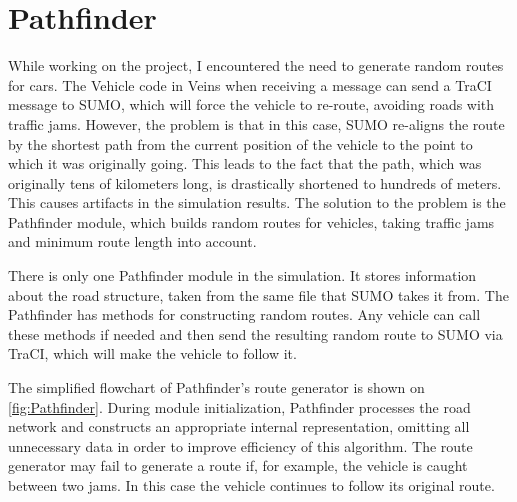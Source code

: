 \documentclass[]{nsm-thesis}
\begin{document}
\section{Pathfinder}

While working on the project, I encountered the need to generate random routes for cars. The Vehicle code in Veins when receiving a message can send a TraCI message to SUMO, which will force the vehicle to re-route, avoiding roads with traffic jams. However, the problem is that in this case, SUMO re-aligns the route by the shortest path from the current position of the vehicle to the point to which it was originally going. This leads to the fact that the path, which was originally tens of kilometers long, is drastically shortened to hundreds of meters. This causes artifacts in the simulation results. The solution to the problem is the Pathfinder module, which builds random routes for vehicles, taking traffic jams and minimum route length into account.

There is only one Pathfinder module in the simulation. It stores information about the road structure, taken from the same file that SUMO takes it from. The Pathfinder has methods for constructing random routes. Any vehicle can call these methods if needed and then send the resulting random route to SUMO via TraCI, which will make the vehicle to follow it.

The simplified flowchart of Pathfinder's route generator is shown on \cref{fig:Pathfinder}. During module initialization, Pathfinder processes the road network and constructs an appropriate internal representation, omitting all unnecessary data in order to improve efficiency of this algorithm. The route generator may fail to generate a route if, for example, the vehicle is caught between two jams. In this case the vehicle continues to follow its original route.
\end{document}
